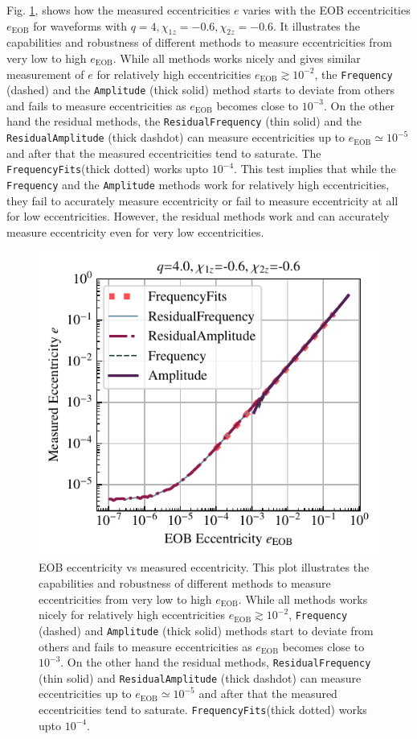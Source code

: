 \documentclass[aps,prd,amsmath,floats,floatfix, twocolumn,
superscriptaddress,nofootinbib,showpacs]{revtex4-1}
\newcommand{\eEOB}{e_{\text{EOB}}}
\newcommand{\mAmp}{\texttt{Amplitude}}
\newcommand{\mFreq}{\texttt{Frequency}}
\newcommand{\mResAmp}{\texttt{ResidualAmplitude}}
\newcommand{\mResFreq}{\texttt{ResidualFrequency}}
\newcommand{\mFreqFits}{\texttt{FrequencyFits}}
\begin{document}
Fig. \ref{fig:eob_vs_measured_ecc}, shows how the measured
eccentricities $e$ varies with the EOB eccentricities $\eEOB$
for waveforms with $q=4, \chi_{1z}=-0.6, \chi_{2z}=-0.6$. It
illustrates the capabilities and robustness of different methods to
measure eccentricities from very low to high $\eEOB$.  While
all methods works nicely and gives similar measurement of $e$ for
relatively high eccentricities $\eEOB \gtrsim 10^{-2}$, the
\mFreq{} (dashed) and the \mAmp{} (thick solid)
method starts to deviate from others and fails to measure
eccentricities as $\eEOB$ becomes close to $10^{-3}$.  On the
other hand the residual methods, the \mResFreq{} (thin
solid) and the \mResAmp{} (thick dashdot) can measure
eccentricities up to $\eEOB \simeq 10^{-5}$ and after that
the measured eccentricities tend to saturate. The
\mFreqFits (thick dotted) works upto $10^{-4}$. This test
implies that while the \mFreq{} and the \mAmp{}
methods work for relatively high eccentricities, they fail to
accurately measure eccentricity or fail to measure eccentricity at all
for low eccentricities. However, the residual methods work and can
accurately measure eccentricity even for very low eccentricities.


\begin{figure}[thb]
\includegraphics[width=\columnwidth]{test_eob_vs_measured_ecc_example}
\caption{
  EOB eccentricity vs measured eccentricity. This plot illustrates the
  capabilities and robustness of different methods to measure
  eccentricities from very low to high $\eEOB$.  While all
  methods works nicely for relatively high eccentricities
  $\eEOB \gtrsim 10^{-2}$, \mFreq{} (dashed) and
  \mAmp{} (thick solid) methods start to deviate from others
  and fails to measure eccentricities as $\eEOB$ becomes close
  to $10^{-3}$. On the other hand the residual methods,
  \mResFreq{} (thin solid) and \mResAmp{}
  (thick dashdot) can measure eccentricities up to $\eEOB
  \simeq 10^{-5}$ and after that the measured eccentricities tend to
  saturate. \mFreqFits (thick dotted) works upto $10^{-4}$.
}
\label{fig:eob_vs_measured_ecc}
\end{figure}
\end{document}
